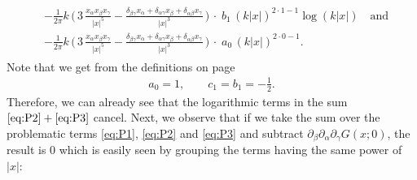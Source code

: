 \begin{align}
  \label{eq:P3}
  \tag{P3}
  \begin{alignedat}{1}
    &- \frac{1}{2\pi} k\, \bigg( \, 3\, \frac{x_\alpha x_\beta x_\gamma}{|x|^5} - \frac{\delta_{\beta\gamma} x_\alpha + \delta_{\alpha\gamma} x_\beta + \delta_{\alpha\beta} x_\gamma}{|x|^3} \, \bigg)
    \, \cdot \; b_1 \, (k|x|)^{2 \cdot 1 - 1} \log(k|x|)  \quad\text{and}\\[0.5em]
    &- \frac{1}{2\pi} k\, \bigg( \, 3\, \frac{x_\alpha x_\beta x_\gamma}{|x|^5} - \frac{\delta_{\beta\gamma} x_\alpha + \delta_{\alpha\gamma} x_\beta + \delta_{\alpha\beta} x_\gamma}{|x|^3} \, \bigg)
  \, \cdot \; a_0 \, (k|x|)^{2 \cdot 0 - 1} .
  \end{alignedat}
\end{align}
Note that we get from the definitions on page \pageref{defnConst}
\begin{align*}
  a_0 = 1, \qquad c_1 = b_1 = - \frac{1}{2}.
\end{align*}
Therefore, we can already see that the logarithmic terms in the sum $\eqref{eq:P2} + \eqref{eq:P3}$ cancel.
Next, we observe that if we take the sum over the problematic terms \eqref{eq:P1}, \eqref{eq:P2} and \eqref{eq:P3} and subtract $\partial_\beta \partial_\alpha \partial_\gamma G(x; 0)$, the result is $0$ which is easily seen by grouping the terms having the same power of $|x|$:
